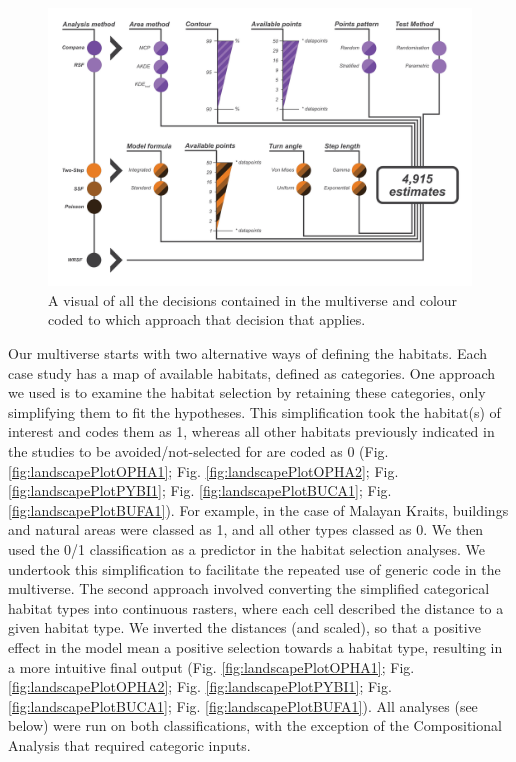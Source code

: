 \documentclass[10pt,a4paper]{article}
\begin{document}
\begin{figure}
\includegraphics[width=1\linewidth]{../ext_images/decisions_visual} \caption{A visual of all the decisions contained in the multiverse and colour coded to which approach that decision that applies.}\label{fig:decisionsFigure}
\end{figure}

Our multiverse starts with two alternative ways of defining the habitats.
Each case study has a map of available habitats, defined as categories.
One approach we used is to examine the habitat selection by retaining these categories, only simplifying them to fit the hypotheses.
This simplification took the habitat(s) of interest and codes them as 1, whereas all other habitats previously indicated in the studies to be avoided/not-selected for are coded as 0 (Fig. \ref{fig:landscapePlotOPHA1}; Fig. \ref{fig:landscapePlotOPHA2}; Fig. \ref{fig:landscapePlotPYBI1}; Fig. \ref{fig:landscapePlotBUCA1}; Fig. \ref{fig:landscapePlotBUFA1}).
For example, in the case of Malayan Kraits, buildings and natural areas were classed as 1, and all other types classed as 0.
We then used the 0/1 classification as a predictor in the habitat selection analyses.
We undertook this simplification to facilitate the repeated use of generic code in the multiverse.
The second approach involved converting the simplified categorical habitat types into continuous rasters, where each cell described the distance to a given habitat type.
We inverted the distances (and scaled), so that a positive effect in the model mean a positive selection towards a habitat type, resulting in a more intuitive final output (Fig. \ref{fig:landscapePlotOPHA1}; Fig. \ref{fig:landscapePlotOPHA2}; Fig. \ref{fig:landscapePlotPYBI1}; Fig. \ref{fig:landscapePlotBUCA1}; Fig. \ref{fig:landscapePlotBUFA1}).
All analyses (see below) were run on both classifications, with the exception of the Compositional Analysis that required categoric inputs.
\end{document}
